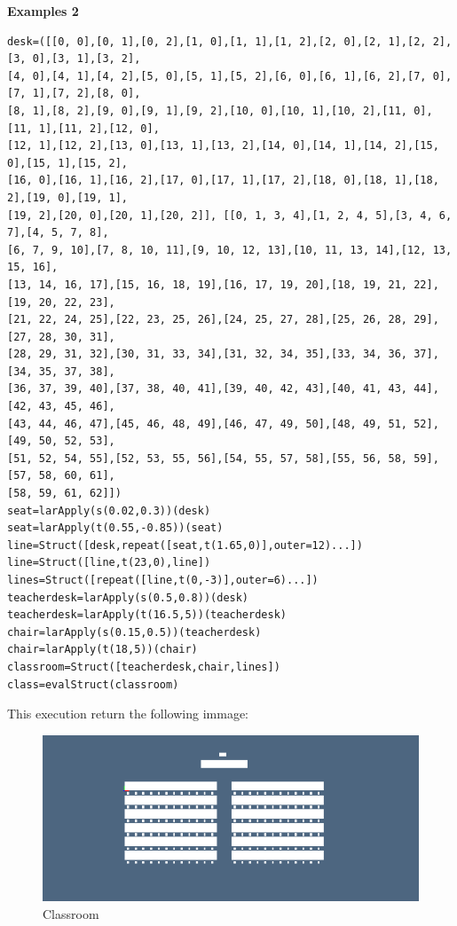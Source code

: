 \documentclass[a4paper,12pt]{article}
\begin{document}
\noindent\textbf{Examples 2}
\begin{Verbatim}[fontsize=\footnotesize]
desk=([[0, 0],[0, 1],[0, 2],[1, 0],[1, 1],[1, 2],[2, 0],[2, 1],[2, 2],[3, 0],[3, 1],[3, 2],
[4, 0],[4, 1],[4, 2],[5, 0],[5, 1],[5, 2],[6, 0],[6, 1],[6, 2],[7, 0],[7, 1],[7, 2],[8, 0],
[8, 1],[8, 2],[9, 0],[9, 1],[9, 2],[10, 0],[10, 1],[10, 2],[11, 0],[11, 1],[11, 2],[12, 0],
[12, 1],[12, 2],[13, 0],[13, 1],[13, 2],[14, 0],[14, 1],[14, 2],[15, 0],[15, 1],[15, 2],
[16, 0],[16, 1],[16, 2],[17, 0],[17, 1],[17, 2],[18, 0],[18, 1],[18, 2],[19, 0],[19, 1],
[19, 2],[20, 0],[20, 1],[20, 2]], [[0, 1, 3, 4],[1, 2, 4, 5],[3, 4, 6, 7],[4, 5, 7, 8],
[6, 7, 9, 10],[7, 8, 10, 11],[9, 10, 12, 13],[10, 11, 13, 14],[12, 13, 15, 16],
[13, 14, 16, 17],[15, 16, 18, 19],[16, 17, 19, 20],[18, 19, 21, 22],[19, 20, 22, 23],
[21, 22, 24, 25],[22, 23, 25, 26],[24, 25, 27, 28],[25, 26, 28, 29],[27, 28, 30, 31],
[28, 29, 31, 32],[30, 31, 33, 34],[31, 32, 34, 35],[33, 34, 36, 37],[34, 35, 37, 38],
[36, 37, 39, 40],[37, 38, 40, 41],[39, 40, 42, 43],[40, 41, 43, 44],[42, 43, 45, 46],
[43, 44, 46, 47],[45, 46, 48, 49],[46, 47, 49, 50],[48, 49, 51, 52],[49, 50, 52, 53],
[51, 52, 54, 55],[52, 53, 55, 56],[54, 55, 57, 58],[55, 56, 58, 59],[57, 58, 60, 61],
[58, 59, 61, 62]])
seat=larApply(s(0.02,0.3))(desk)
seat=larApply(t(0.55,-0.85))(seat)
line=Struct([desk,repeat([seat,t(1.65,0)],outer=12)...])
line=Struct([line,t(23,0),line])
lines=Struct([repeat([line,t(0,-3)],outer=6)...])
teacherdesk=larApply(s(0.5,0.8))(desk)
teacherdesk=larApply(t(16.5,5))(teacherdesk)
chair=larApply(s(0.15,0.5))(teacherdesk)
chair=larApply(t(18,5))(chair)
classroom=Struct([teacherdesk,chair,lines])
class=evalStruct(classroom)
\end{Verbatim}
This execution return the following immage:

\begin{figure}[!h]
\centering
\includegraphics[scale=0.6]{classroom.png}
\caption{Classroom}
\end{figure}
\end{document}
